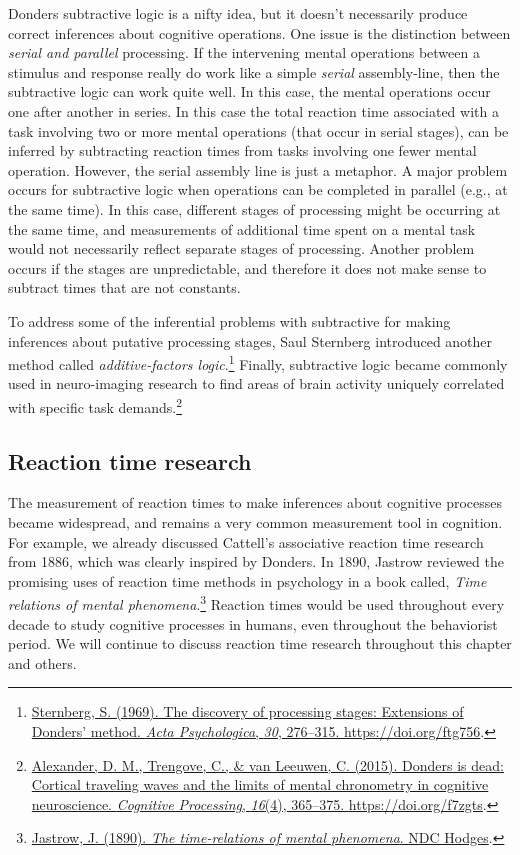 \documentclass[
  oneside,
  12pt]{crumpbook}
\begin{document}
Donders subtractive logic is a nifty idea, but it doesn't necessarily produce correct inferences about cognitive operations. One issue is the distinction between \emph{serial and parallel} processing. If the intervening mental operations between a stimulus and response really do work like a simple \emph{serial} assembly-line, then the subtractive logic can work quite well. In this case, the mental operations occur one after another in series. In this case the total reaction time associated with a task involving two or more mental operations (that occur in serial stages), can be inferred by subtracting reaction times from tasks involving one fewer mental operation. However, the serial assembly line is just a metaphor. A major problem occurs for subtractive logic when operations can be completed in parallel (e.g., at the same time). In this case, different stages of processing might be occurring at the same time, and measurements of additional time spent on a mental task would not necessarily reflect separate stages of processing. Another problem occurs if the stages are unpredictable, and therefore it does not make sense to subtract times that are not constants.

To address some of the inferential problems with subtractive for making inferences about putative processing stages, Saul Sternberg introduced another method called \emph{additive-factors logic}.\footnote{\protect\hyperlink{ref-sternbergDiscoveryProcessingStages1969a}{Sternberg, S. (1969). The discovery of processing stages: {Extensions} of {Donders}' method. \emph{Acta Psychologica}, \emph{30}, 276--315. \url{https://doi.org/ftg756}}.} Finally, subtractive logic became commonly used in neuro-imaging research to find areas of brain activity uniquely correlated with specific task demands.\footnote{\protect\hyperlink{ref-alexanderDondersDeadCortical2015}{Alexander, D. M., Trengove, C., \& van Leeuwen, C. (2015). Donders is dead: Cortical traveling waves and the limits of mental chronometry in cognitive neuroscience. \emph{Cognitive Processing}, \emph{16}(4), 365--375. \url{https://doi.org/f7zgts}}.}

\hypertarget{reaction-time-research}{%
\subsection{Reaction time research}\label{reaction-time-research}}

The measurement of reaction times to make inferences about cognitive processes became widespread, and remains a very common measurement tool in cognition. For example, we already discussed Cattell's associative reaction time research from 1886, which was clearly inspired by Donders. In 1890, Jastrow reviewed the promising uses of reaction time methods in psychology in a book called, \emph{Time relations of mental phenomena}.\footnote{\protect\hyperlink{ref-jastrowTimerelationsMentalPhenomena1890}{Jastrow, J. (1890). \emph{The time-relations of mental phenomena}. {NDC Hodges}}.} Reaction times would be used throughout every decade to study cognitive processes in humans, even throughout the behaviorist period. We will continue to discuss reaction time research throughout this chapter and others.
\end{document}
